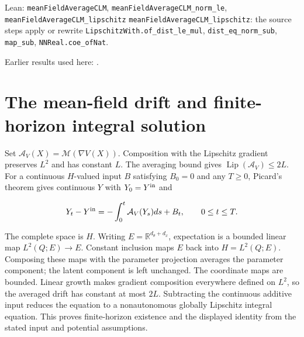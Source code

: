 \documentclass[11pt,a4paper]{article}
\begin{document}
\begin{leanbox}{Lean: \texttt{meanFieldAverageCLM}, \texttt{meanFieldAverageCLM\_\allowbreak{}norm\_\allowbreak{}le}, \texttt{meanFieldAverageCLM\_\allowbreak{}lipschitz}}
\texttt{mean\allowbreak{}Field\allowbreak{}Average\allowbreak{}CLM\_\allowbreak{}lipschitz}: the source steps apply or rewrite \texttt{Lipschitz\allowbreak{}With.\allowbreak{}of\_\allowbreak{}dist\_\allowbreak{}le\_\allowbreak{}mul}, \texttt{dist\_\allowbreak{}eq\_\allowbreak{}norm\_\allowbreak{}sub}, \texttt{map\_\allowbreak{}sub}, \texttt{NNReal.\allowbreak{}coe\_\allowbreak{}of\allowbreak{}Nat}.
\end{leanbox}


Earlier results used here: \cite[Section~3.1.1]{LangevinLean2026IPLA}.

\section{\texorpdfstring{The mean-field drift and finite-horizon integral solution}{The mean-field drift and finite-horizon integral solution}}


Set \(\mathcal A_V(X)=\mathcal M(\nabla V(X))\). Composition with the Lipschitz gradient preserves \(L^2\) and has constant \(L\). The averaging bound gives \(\operatorname{Lip}(\mathcal A_V)\le2L\). For a continuous \(H\)-valued input \(B\) satisfying \(B_0=0\) and any \(T\ge0\), Picard’s theorem gives continuous \(Y\) with \(Y_0=Y^{\rm in}\) and

\[Y_t-Y^{\rm in}=-\int_0^t\mathcal A_V(Y_s)ds+B_t,\qquad0\le t\le T.\]

The complete space is \(H\). Writing \(E=\mathbb R^{d_\theta+d_x}\), expectation is a bounded linear map \(L^2(Q;E)\to E\). Constant inclusion maps \(E\) back into \(H=L^2(Q;E)\). Composing these maps with the parameter projection averages the parameter component; the latent component is left unchanged. The coordinate maps are bounded. Linear growth makes gradient composition everywhere defined on \(L^2\), so the averaged drift has constant at most \(2L\). Subtracting the continuous additive input reduces the equation to a nonautonomous globally Lipschitz integral equation. This proves finite-horizon existence and the displayed identity from the stated input and potential assumptions.
\end{document}
